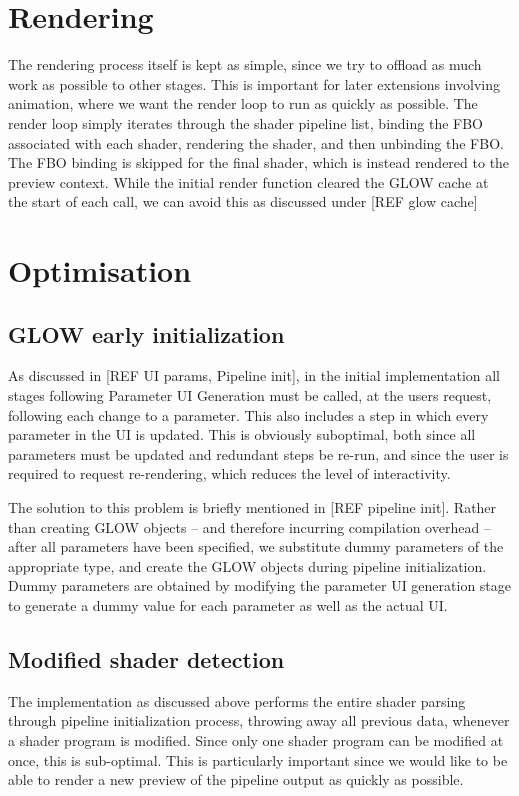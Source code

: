 \documentclass[12pt,twoside,notitlepage]{report}
\begin{document}
\section{Rendering}
The rendering process itself is kept as simple, since we try to offload as much work as possible to other stages. This is important for later extensions involving animation, where we want the render loop to run as quickly as possible. The render loop simply iterates through the shader pipeline list, binding the FBO associated with each shader, rendering the shader, and then unbinding the FBO. The FBO binding is skipped for the final shader, which is instead rendered to the preview context. While the initial render function cleared the GLOW cache at the start of each call, we can avoid this as discussed under [REF glow cache]

\section{Optimisation}
\subsection{GLOW early initialization}
As discussed in [REF UI params, Pipeline init], in the initial implementation all stages following Parameter UI Generation must be called, at the users request, following each change to a parameter. This also includes a step in which every parameter in the UI is updated. This is obviously suboptimal, both since all parameters must be updated and redundant steps be re-run, and since the user is required to request re-rendering, which reduces the level of interactivity.

The solution to this problem is briefly mentioned in [REF pipeline init]. Rather than creating GLOW objects -- and therefore incurring compilation overhead -- after all parameters have been specified, we substitute dummy parameters of the appropriate type, and create the GLOW objects during pipeline initialization. Dummy parameters are obtained by modifying the parameter UI generation stage to generate a dummy value for each parameter as well as the actual UI.

\subsection{Modified shader detection}
The implementation as discussed above performs the entire shader parsing through pipeline initialization process, throwing away all previous data, whenever a shader program is modified. Since only one shader program can be modified at once, this is sub-optimal. This is particularly important since we would like to be able to render a new preview of the pipeline output as quickly as possible.
\end{document}
